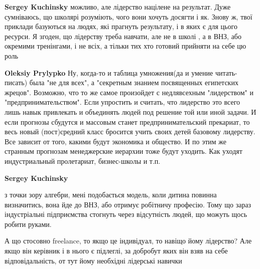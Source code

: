 \begin{itemize}
\begin{itemize}
 
\textbf{Sergey Kuchinsky} можливо, але лідерство націлене на результат. Дуже
сумніваюсь, що школярі розуміють, чого вони хочуть досягти і як. Знову ж, твої
приклади базуються на людях, які прагнуть результату, і в яких є для цього
ресурси. Я згоден, що лідерству треба навчати, але не в школі , а в ВНЗ, або
окремими тренінгами, і не всіх, а тільки тих хто готовий прийняти на себе цю
роль


 
\textbf{Oleksiy Prylypko} Ну, когда-то и таблица умножения(да и умение
читать-писать) была "не для всех", а "секретным знанием посвященных египетских
жрецов". Возможно, что то же самое произойдет с недлявсехным "лидерством" и
"предпринимательством". Если упростить и считать, что лидерство это всего лишь
навык привлекать и объединять людей под решение той или иной задачи. И если
прогнозы сбудутся и массовым станет предпринимательский прекариат, то весь
новый (пост)средний класс бросится учить своих детей базовому лидерству. Все
зависит от того, какими будут экономика и общество. И по этим же странным
прогнозам менеджерские иерархии тоже будут уходить. Как уходят индустриальный
пролетариат, бизнес-школы и т.п.

 
\textbf{Sergey Kuchinsky} 

з точки зору алгебри, мені подобається модель, коли дитина повинна визначитись,
вона йде до ВНЗ, або отримує робітничу професію. Тому що зараз індустріальні
підприємства стогнуть через відсутність людей, що можуть щось робити руками.

А що стосовно freelance, то якщо це індивідуал, то навіщо йому лідерство? Але
якщо він керівник і в нього є підлеглі, за добробут яких він взяв на себе
відповідальність, от тут йому необхідні лідерські навички


\end{itemize}
\end{itemize}
